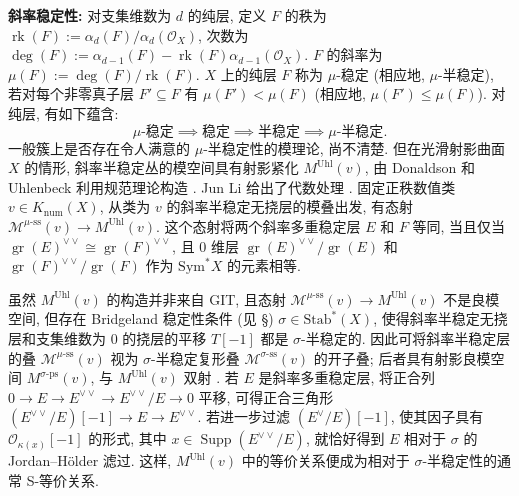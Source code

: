 \textbf{斜率稳定性:} 对支集维数为 $d$ 的纯层, 定义 $F$ 的秩为 $\operatorname{rk}(F):=\alpha_d(F)/\alpha_d(\mathcal O_X)$, 次数为 $\deg(F):=\alpha_{d-1}(F)-\operatorname{rk}(F)\alpha_{d-1}(\mathcal O_X)$. $F$ 的斜率为 $\mu(F):=\deg(F)/\operatorname{rk}(F)$. $X$ 上的纯层 $F$ 称为 $\mu$-稳定 (相应地, $\mu$-半稳定), 若对每个非零真子层 $F'\subseteq F$ 有 $\mu(F')<\mu(F)$ (相应地, $\mu(F')\leq\mu(F)$). 对纯层, 有如下蕴含:
\[
\mu\text{-稳定}\implies\text{稳定}\implies\text{半稳定}\implies\mu\text{-半稳定}.
\]
一般簇上是否存在令人满意的 $\mu$-半稳定性的模理论, 尚不清楚. 但在光滑射影曲面 $X$ 的情形, 斜率半稳定丛的模空间具有射影紧化 $M^{\mathrm{Uhl}}(v)$, 由 Donaldson 和 Uhlenbeck 利用规范理论构造 \cite{Don86,Uhl82}. Jun Li 给出了代数处理 \cite{Li93}. 固定正秩数值类 $v\in K_{\mathrm{num}}(X)$, 从类为 $v$ 的斜率半稳定无挠层的模叠出发, 有态射 $\mathcal M^{\mu\text{-}\mathrm{ss}}(v)\to M^{\mathrm{Uhl}}(v)$. 这个态射将两个斜率多重稳定层 $E$ 和 $F$ 等同, 当且仅当 $\operatorname{gr}(E)^{\vee\vee}\cong\operatorname{gr}(F)^{\vee\vee}$, 且 $0$ 维层 $\operatorname{gr}(E)^{\vee\vee}/\operatorname{gr}(E)$ 和 $\operatorname{gr}(F)^{\vee\vee}/\operatorname{gr}(F)$ 作为 $\mathrm{Sym}^*X$ 的元素相等.

虽然 $M^{\mathrm{Uhl}}(v)$ 的构造并非来自 GIT, 且态射 $\mathcal M^{\mu\text{-}\mathrm{ss}}(v)\to M^{\mathrm{Uhl}}(v)$ 不是良模空间, 但存在 Bridgeland 稳定性条件 (见 \S{}) $\sigma\in\mathrm{Stab}^*(X)$, 使得斜率半稳定无挠层和支集维数为 $0$ 的挠层的平移 $T[-1]$ 都是 $\sigma$-半稳定的. 因此可将斜率半稳定层的叠 $\mathcal M^{\mu\text{-}\mathrm{ss}}(v)$ 视为 $\sigma$-半稳定复形叠 $\mathcal M^{\sigma\text{-}\mathrm{ss}}(v)$ 的开子叠; 后者具有射影良模空间 $M^{\sigma\text{-}\mathrm{ps}}(v)$, 与 $M^{\mathrm{Uhl}}(v)$ 双射 \cite{Taj23}. 若 $E$ 是斜率多重稳定层, 将正合列 $0\to E\to E^{\vee\vee}\to E^{\vee\vee}/E\to0$ 平移, 可得正合三角形 $(E^{\vee\vee}/E)[-1]\to E\to E^{\vee\vee}$. 若进一步过滤 $(E^\vee/E)[-1]$, 使其因子具有 $\mathcal O_{\kappa(x)}[-1]$ 的形式, 其中 $x\in\operatorname{Supp}(E^{\vee\vee}/E)$, 就恰好得到 $E$ 相对于 $\sigma$ 的 Jordan--H\"older 滤过. 这样, $M^{\mathrm{Uhl}}(v)$ 中的等价关系便成为相对于 $\sigma$-半稳定性的通常 S-等价关系.

